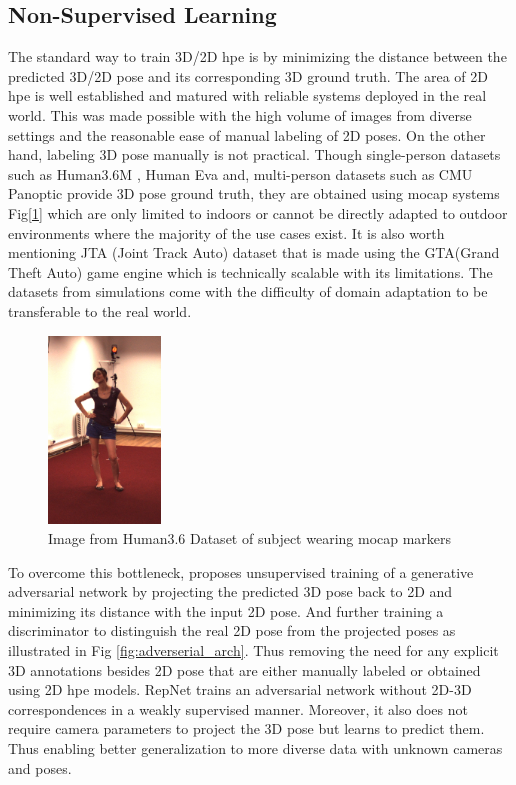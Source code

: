\subsection{Non-Supervised Learning}
\label{subsec:non_supervised_learning}
The standard way to train 3D/2D \ac{hpe} is by minimizing the distance between the predicted 3D/2D pose and its corresponding 3D ground truth. The area of 2D \ac{hpe} is well established and matured with reliable systems deployed in the real world. This was made possible with the high volume of images from diverse settings and the reasonable ease of manual labeling of 2D poses. On the other hand, labeling 3D pose manually is not practical. Though single-person datasets such as Human3.6M \cite{H3.6}, Human Eva \cite{HumanEva} and, multi-person datasets such as CMU Panoptic \cite{cmuPanoptic} provide 3D pose ground truth, they are obtained using \ac{mocap} systems Fig[\ref{fig:h36_mocap}] which are only limited to indoors or cannot be directly adapted to outdoor environments where the majority of the use cases exist. It is also worth mentioning JTA (Joint Track Auto) dataset \cite{JTA} that is made using the GTA(Grand Theft Auto) game engine which is technically scalable with its limitations. The datasets from simulations come with the difficulty of domain adaptation to be transferable to the real world.

\begin{figure}[h]
    \centering
    \includegraphics[width=30mm]{figures/h36/h36_mocap.png}
    \caption{Image from Human3.6 Dataset \cite{H3.6} of subject wearing \ac{mocap} markers}
    \label{fig:h36_mocap}
\end{figure}

To overcome this bottleneck, \cite{unsupervisedAdversarial} proposes unsupervised training of a generative adversarial network by projecting the predicted 3D pose back to 2D and minimizing its distance with the input 2D pose. And further training a discriminator to distinguish the real 2D pose from the projected poses as illustrated in Fig \ref{fig:adverserial_arch}. Thus removing the need for any explicit 3D annotations besides 2D pose that are either manually labeled or obtained using 2D \ac{hpe} models. RepNet \cite{repnet} trains an adversarial network without 2D-3D correspondences in a weakly supervised manner. Moreover, it also does not require camera parameters to project the 3D pose but learns to predict them. Thus enabling better generalization to more diverse data with unknown cameras and poses.


